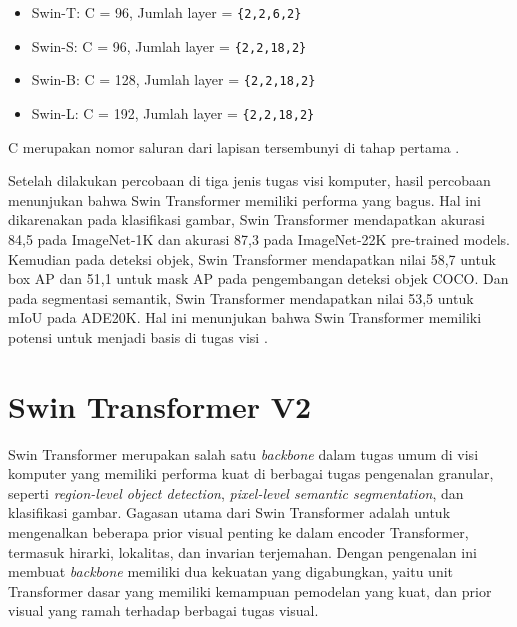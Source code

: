 \begin{itemize}[nolistsep]

  \item Swin-T: C = 96, Jumlah layer = \verb|{2,2,6,2}|

  \item Swin-S: C = 96, Jumlah layer = \verb|{2,2,18,2}|

  \item Swin-B: C = 128, Jumlah layer = \verb|{2,2,18,2}|

  \item Swin-L: C = 192, Jumlah layer = \verb|{2,2,18,2}|

\end{itemize}

C merupakan nomor saluran dari lapisan tersembunyi di tahap pertama \parencite{Liu2021}.

Setelah dilakukan percobaan di tiga jenis tugas visi komputer, hasil percobaan menunjukan bahwa Swin Transformer memiliki performa yang bagus. Hal ini dikarenakan pada klasifikasi gambar, Swin 
Transformer mendapatkan akurasi 84,5 pada ImageNet-1K dan akurasi 87,3 pada ImageNet-22K pre-trained models. Kemudian pada deteksi objek, Swin Transformer mendapatkan nilai 58,7 untuk box AP dan 51,1 
untuk mask AP pada pengembangan deteksi objek COCO. Dan pada segmentasi semantik, Swin Transformer mendapatkan nilai 53,5 untuk mIoU pada ADE20K. Hal ini menunjukan bahwa Swin Transformer memiliki potensi 
untuk menjadi basis di tugas visi \parencite{Liu2021}.

\section{Swin Transformer V2}
\label{sec:swintransformerv2}

Swin Transformer merupakan salah satu \emph{backbone} dalam tugas umum di visi komputer yang memiliki performa kuat di berbagai tugas pengenalan granular, seperti \emph{region-level object detection}, 
\emph{pixel-level semantic segmentation}, dan klasifikasi gambar. Gagasan utama dari Swin Transformer adalah untuk mengenalkan beberapa prior visual penting ke dalam encoder Transformer, termasuk hirarki, 
lokalitas, dan invarian terjemahan. Dengan pengenalan ini membuat \emph{backbone} memiliki dua kekuatan yang digabungkan, yaitu unit Transformer dasar yang memiliki kemampuan pemodelan yang kuat, dan prior 
visual yang ramah terhadap berbagai tugas visual.\parencite{Liuv22021}

